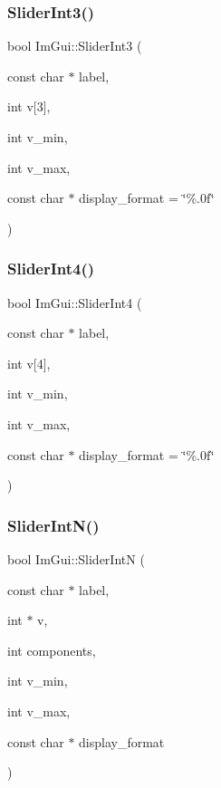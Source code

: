 \mbox{\label{namespace_im_gui_a099188a7fdaad1a8103e6e24f41e1a8a}} 
\subsubsection{\texorpdfstring{Slider\+Int3()}{SliderInt3()}}
{\footnotesize\ttfamily bool Im\+Gui\+::\+Slider\+Int3 (\begin{DoxyParamCaption}\item[{const char $\ast$}]{label,  }\item[{int}]{v\mbox{[}3\mbox{]},  }\item[{int}]{v\+\_\+min,  }\item[{int}]{v\+\_\+max,  }\item[{const char $\ast$}]{display\+\_\+format = {\ttfamily \char`\"{}\%.0f\char`\"{}} }\end{DoxyParamCaption})}

\mbox{\label{namespace_im_gui_a88c24aa0e5af4cbb14559b5789886810}} 
\subsubsection{\texorpdfstring{Slider\+Int4()}{SliderInt4()}}
{\footnotesize\ttfamily bool Im\+Gui\+::\+Slider\+Int4 (\begin{DoxyParamCaption}\item[{const char $\ast$}]{label,  }\item[{int}]{v\mbox{[}4\mbox{]},  }\item[{int}]{v\+\_\+min,  }\item[{int}]{v\+\_\+max,  }\item[{const char $\ast$}]{display\+\_\+format = {\ttfamily \char`\"{}\%.0f\char`\"{}} }\end{DoxyParamCaption})}

\mbox{\label{namespace_im_gui_a13fe35db80c7d1002c98fd5e8ea90239}} 
\subsubsection{\texorpdfstring{Slider\+Int\+N()}{SliderIntN()}}
{\footnotesize\ttfamily bool Im\+Gui\+::\+Slider\+IntN (\begin{DoxyParamCaption}\item[{const char $\ast$}]{label,  }\item[{int $\ast$}]{v,  }\item[{int}]{components,  }\item[{int}]{v\+\_\+min,  }\item[{int}]{v\+\_\+max,  }\item[{const char $\ast$}]{display\+\_\+format }\end{DoxyParamCaption})}


